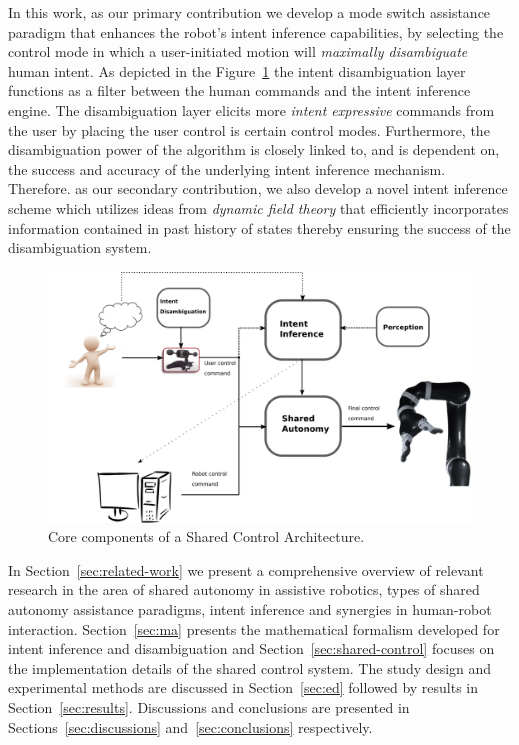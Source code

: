 In this work, as our primary contribution we develop a mode switch assistance paradigm that enhances the robot's intent inference capabilities, by selecting the control mode in which a user-initiated motion will \textit{maximally disambiguate} human intent. As depicted in the Figure~\ref{fig:shared_control} the intent disambiguation layer functions as a filter between the human commands and the intent inference engine. The disambiguation layer elicits more \textit{intent expressive} commands from the user by placing the user control is certain control modes. Furthermore, the disambiguation power of the algorithm is closely linked to, and is dependent on, the success and accuracy of the underlying intent inference mechanism. Therefore. as our secondary contribution, we also develop a novel intent inference scheme which utilizes ideas from \textit{dynamic field theory} that efficiently incorporates information contained in past history of states thereby ensuring the success of the disambiguation system. 
\begin{figure}[t!]
	\includegraphics[keepaspectratio, width = \textwidth]{./figures/Fig2_SharedControl.eps}
	\caption{Core components of a Shared Control Architecture. }
	\label{fig:shared_control}
\end{figure}
In Section~\ref{sec:related-work} we present a comprehensive overview of relevant research in the area of shared autonomy in assistive robotics, types of shared autonomy assistance paradigms, intent inference and synergies in human-robot interaction. Section~\ref{sec:ma} presents the mathematical formalism developed for intent inference and disambiguation and Section~\ref{sec:shared-control} focuses on the implementation details of the shared control system. The study design and experimental methods are discussed in Section~\ref{sec:ed} followed by results in Section~\ref{sec:results}. Discussions and conclusions are presented in Sections~\ref{sec:discussions} and~\ref{sec:conclusions} respectively. 


